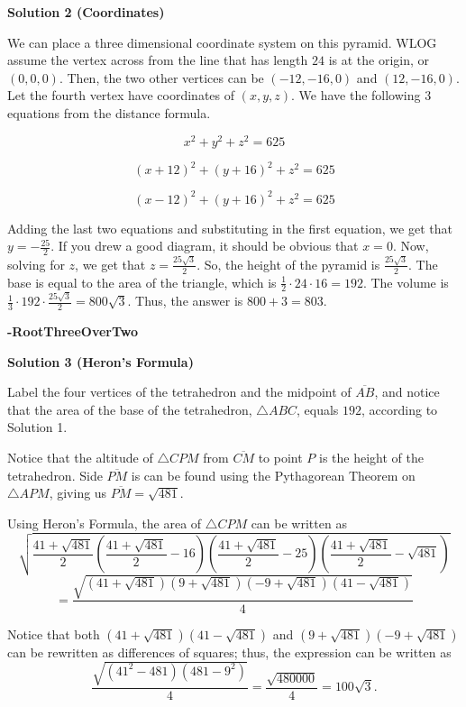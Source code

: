 \begin{enumerate}
 



\textbf{Solution 2 (Coordinates)}

We can place a three dimensional coordinate system on this pyramid. WLOG assume the vertex across from the line that has length $24$ is at the origin, or $(0, 0, 0)$. Then, the two other vertices can be $(-12, -16, 0)$ and $(12, -16, 0)$. Let the fourth vertex have coordinates of $(x, y, z)$. We have the following $3$ equations from the distance formula.

 
 \[x^2+y^2+z^2=625\]

 \[(x+12)^2+(y+16)^2+z^2=625\]

 \[(x-12)^2+(y+16)^2+z^2=625\]

 Adding the last two equations and substituting in the first equation, we get that $y=-\frac{25}{2}$. If you drew a good diagram, it should be obvious that $x=0$. Now, solving for $z$, we get that $z=\frac{25\sqrt{3}}{2}$. So, the height of the pyramid is $\frac{25\sqrt{3}}{2}$. The base is equal to the area of the triangle, which is $\frac{1}{2} \cdot 24 \cdot 16 = 192$. The volume is $\frac{1}{3} \cdot 192 \cdot \frac{25\sqrt{3}}{2} = 800\sqrt{3}$. Thus, the answer is $800+3 = \boxed{803}$.

 \textbf{-RootThreeOverTwo}

 



\textbf{Solution 3 (Heron's Formula)}

Label the four vertices of the tetrahedron and the midpoint of $\overline {AB}$, and notice that the area of the base of the tetrahedron, $\triangle ABC$, equals $192$, according to Solution 1. 

 Notice that the altitude of $\triangle CPM$ from $\overline {CM}$ to point $P$ is the height of the tetrahedron. Side $\overline {PM}$ is can be found using the Pythagorean Theorem on $\triangle APM$, giving us $\overline {PM}=\sqrt{481}.$ 

 Using Heron's Formula, the area of $\triangle CPM$ can be written as 
 \[\sqrt{\frac{41+\sqrt{481}}{2}(\frac{41+\sqrt{481}}{2}-16)(\frac{41+\sqrt{481}}{2}-25)(\frac{41+\sqrt{481}}{2}-\sqrt{481})}\]
 \[=\frac{\sqrt{(41+\sqrt{481})(9+\sqrt{481})(-9+\sqrt{481})(41-\sqrt{481})}}{4}\]

 Notice that both $(41+\sqrt{481})(41-\sqrt{481})$ and $(9+\sqrt{481})(-9+\sqrt{481})$ can be rewritten as differences of squares; thus, the expression can be written as 
 \[\frac{\sqrt{(41^2-481)(481-9^2)}}{4}=\frac{\sqrt{480000}}{4}=100\sqrt{3}.\]


\end{enumerate}

